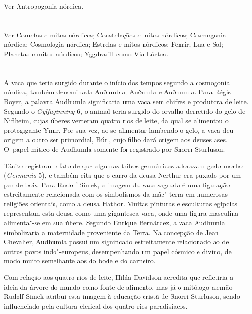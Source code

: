 Ver Antropogonia nórdica.

\section{ }

Ver Cometas e mitos nórdicos; Constelações e mitos nórdicos; Cosmogonia
nórdica; Cosmologia nórdica; Estrelas e mitos nórdicos; Fenrir; Lua e
Sol; Planetas e mitos nórdicos; Yggdrasill como Via Láctea.

\section{}

A vaca que teria surgido durante o início dos tempos segundo a
cosmogonia nórdica, também denominada Auðumbla, Auðumla e Auðhumla. Para
Régis Boyer, a palavra Audhumla significaria uma vaca sem chifres e
produtora de leite. Segundo o \emph{Gylfaginning} 6, o animal teria
surgido do orvalho derretido do gelo de Niflheim, cujas úberes verteram
quatro rios de leite, da qual se alimentou o protogigante Ymir. Por sua
vez, ao se alimentar lambendo o gelo, a vaca deu origem a outro ser
primordial, Búri, cujo filho dará origem aos deuses ases. O~papel mítico
de Audhumla somente foi registrado por Snorri Sturluson.

Tácito registrou o fato de que algumas tribos germânicas adoravam gado
mocho (\emph{Germania} 5), e também cita que o carro da deusa Nerthur
era puxado por um par de bois. Para Rudolf Simek, a imagem da vaca
sagrada é uma figuração estreitamente relacionada com os simbolismos da
mãe"-terra em numerosas religiões orientais, como a deusa Hathor. Muitas
pinturas e esculturas egípcias representam esta deusa como uma
gigantesca vaca, onde uma figura masculina alimenta"-se em sua úbere.
Segundo Enrique Bernárdez, a vaca Audhumla simbolizaria a maternidade
proveniente da Terra. Na concepção de Jean Chevalier, Audhumla possui um
significado estreitamente relacionado ao de outros povos indo"-europeus,
desempenhando um papel cósmico e divino, de modo muito semelhante aos do
bode e do carneiro.

Com relação aos quatro rios de leite, Hilda Davidson acredita que
refletiria a ideia da árvore do mundo como fonte de alimento, mas já o
mitólogo alemão Rudolf Simek atribui esta imagem à educação cristã de
Snorri Sturluson, sendo influenciado pela cultura clerical dos quatro
rios paradisíacos.

